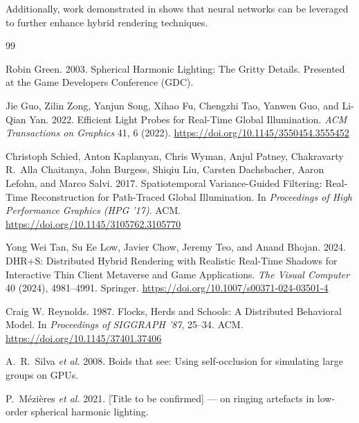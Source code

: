 \documentclass[12pt]{article}
\begin{document}
Additionally, work demonstrated in %
shows that neural networks can be leveraged to further enhance hybrid rendering techniques.



\clearpage
\begin{thebibliography}{99}

Robin Green. 2003. Spherical Harmonic Lighting: The Gritty Details.
Presented at the Game Developers Conference (GDC).


Jie Guo, Zilin Zong, Yanjun Song, Xihao Fu, Chengzhi Tao, Yanwen Guo, and Li-Qian Yan. 2022.
Efficient Light Probes for Real-Time Global Illumination.
\textit{ACM Transactions on Graphics} 41, 6 (2022).
\url{https://doi.org/10.1145/3550454.3555452}

Christoph Schied, Anton Kaplanyan, Chris Wyman, Anjul Patney,
Chakravarty R.\ Alla Chaitanya, John Burgess, Shiqiu Liu,
Carsten Dachsbacher, Aaron Lefohn, and Marco Salvi. 2017.
Spatiotemporal Variance-Guided Filtering: Real-Time Reconstruction for
Path-Traced Global Illumination.
In \textit{Proceedings of High Performance Graphics (HPG '17)}. ACM.
\url{https://doi.org/10.1145/3105762.3105770}

Yong Wei Tan, Su Ee Low, Javier Chow, Jeremy Teo, and Anand Bhojan. 2024.
DHR+S: Distributed Hybrid Rendering with Realistic Real-Time Shadows for
Interactive Thin Client Metaverse and Game Applications.
\textit{The Visual Computer} 40 (2024), 4981--4991. Springer.
\url{https://doi.org/10.1007/s00371-024-03501-4}

Craig W. Reynolds. 1987. Flocks, Herds and Schools: A Distributed Behavioral Model.
In \textit{Proceedings of SIGGRAPH '87}, 25--34. ACM.
\url{https://doi.org/10.1145/37401.37406}

A.\ R.\ Silva \textit{et al.} 2008.
Boids that see: Using self-occlusion for simulating large groups on GPUs.


P.\ M\'ezi\`eres \textit{et al.} 2021.
[Title to be confirmed] --- on ringing artefacts in low-order spherical harmonic lighting.



\end{thebibliography}
\end{document}
